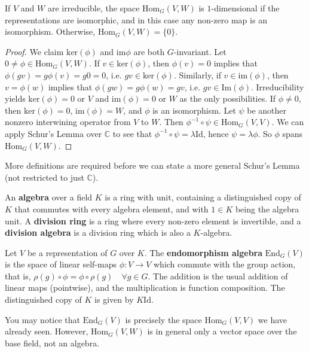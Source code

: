 \begin{cor}\label{schur-cor}
If $V$ and $W$ are irreducible, the space $\text{Hom}_G(V,W)$ is $1$-dimensional if the representations are isomorphic, and in this case any non-zero map is an isomorphism. Otherwise,  $\text{Hom}_G(V,W)=\{0\}$.
\end{cor}
\begin{proof}
We claim $\text{ker}(\phi)$ and $\text{im}\phi$ are both $G$-invariant.  Let $0 \neq \phi \in \text{Hom}_G(V,W)$.  If $v \in \text{ker}(\phi)$, then $\phi(v)=0$ implies that $\phi(gv) = g\phi(v) = g0 = 0$, i.e. $gv \in \text{ker}(\phi)$.  Similarly, if $v \in \text{im}(\phi)$, then $v = \phi(w)$ implies that $\phi(gw) = g \phi(w) = gv$, i.e. $gv \in \text{Im} (\phi)$.
Irreducibility yields $\text{ker}(\phi) = 0$ or $V$ and $\text{im}(\phi) = 0$ or $W$ as the only possibilities.  If $\phi \neq 0$, then $\text{ker}(\phi)=0$, $\text{im}(\phi)=W$, and $\phi$ is an isomorphism.  
Let $\psi$ be another nonzero interwining operator from $V$ to $W$.  Then $\phi ^{-1} \circ \psi \in \text{Hom}_G (V,V)$.  We can apply Schur's Lemma over $\mathbb{C}$ to see that $\phi ^{-1} \circ \psi = \lambda \text{Id}$, hence $\psi = \lambda \phi$.  So $\phi$ spans $\text{Hom}_G(V,W)$.
\end{proof}

More definitions are required before we can state a more general Schur's Lemma (not restricted to just $\mathbb{C}$).

\begin{defn}
An \textbf{algebra} over a field $K$ is a ring with unit, containing a distinguished copy of $K$ that commutes with every algebra element, and with $1 \in K$ being the algebra unit.  A \textbf{division ring} is a ring where every non-zero element is invertible, and a \textbf{division algebra} is a division ring which is also a $K$-algebra.
\end{defn}

\begin{defn}
Let $V$ be a representation of $G$ over $K$.  The \textbf{endomorphism algebra} $\text{End}_G(V)$ is the space of linear self-maps $\phi \colon V \to V$ which commute with the group action, that is, $\rho(g) \circ \phi = \phi \circ \rho(g) \quad \forall g \in G$.  The addition is the usual addition of linear maps (pointwise), and the multiplication is function composition.  The distinguished copy of $K$ is given by $K \text{Id}$.
\end{defn}
\begin{note}
You may notice that $\text{End}_G(V)$ is precisely the space $\text{Hom}_G(V,V)$ we have already seen.  However, $\text{Hom}_G(V,W)$ is in general only a vector space over the base field, not an algebra.
\end{note}

